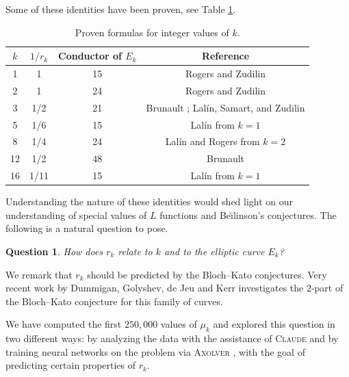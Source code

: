 \documentclass[12pt]{amsart}%
\newcommand{\1}{\mathds{1}}
\newtheorem{qu}[thm]{Question}
\theoremstyle{definition}
\numberwithin{equation}{section}
\numberwithin{table}{section}
\numberwithin{figure}{section}
\begin{document}
Some of these identities have been proven, see Table \ref{table:proven_integer}.
\begin{table}[h]
\centering
\begin{tabular}{cccc}
\hline
$k$ & $1/r_k$ & Conductor of $E_k$ & Reference \\
\hline
1  & 1      & 15   & Rogers and Zudilin \cite{RZ14} \\
2  & 1      & 24   & Rogers and Zudilin \cite{RZ12} \\
3  & 1/2    & 21   & Brunault \cite{Brunault-Siegel}; Lal\'in, Samart, and Zudilin \cite{LSZ16} \\
5  & 1/6    & 15   &  Lal\'in \cite{La10} from $k=1$ \\
8  & 1/4    & 24   & Lal\'in and Rogers \cite{LR07} from $k=2$\\
12 & 1/2    & 48   & Brunault \cite{Brunault-Siegel} \\
16 & 1/11   & 15   & Lal\'in \cite{La10} from $k=1$ \\
\hline
\end{tabular}
\caption{Proven formulas for integer values of $k$.}
\label{table:proven_integer}
\end{table}


Understanding the nature of these identities would shed light on our understanding of special values of $L$ functions and Be\u\i linson's conjectures. The following is a natural question to pose.
\begin{qu}
    How does $r_k$ relate to $k$ and to the elliptic curve $E_k$?
\end{qu}

We remark that $r_k$ should be predicted by the Bloch--Kato conjectures. Very recent work by Dummigan, Golyshev, de Jeu and Kerr \cite{DGJK} investigates the $2$-part of the Bloch--Kato conjecture for this family of curves.


We have computed the first $250{,}000$ values of $\mu_k$ and explored this question in two different ways: by analyzing the data with the assistance of  \textsc{Claude} and by training neural networks on the  problem via \textsc{Axolver}%
, with the goal of predicting certain properties of $r_k$.
\end{document}
